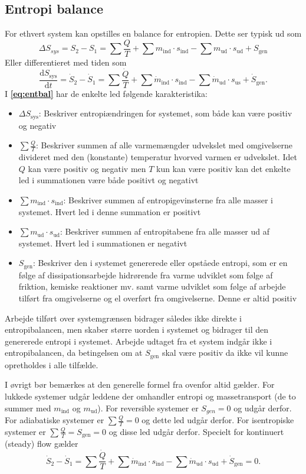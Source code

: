 \subsection{Entropi balance}
For ethvert system kan opstilles en balance for entropien. Dette ser typisk ud som
\begin{equation} \label{eq:entbal}
  \Delta S_{sys} = S_2 - S_1 = \sum \frac{Q}{T} + \sum m_{\mathrm{ind}} \cdot s_{\mathrm{ind}} - \sum m_{\mathrm{ud}} \cdot s_{\mathrm{ud}} + S_{\mathrm{gen}}
\end{equation}
Eller differentieret med tiden som
\[ 
\frac{\mathrm{d}S_{\mathrm{sys}}}{\mathrm{d}t} = \dot{S}_2 - \dot{S}_1 = \sum \frac{\dot{Q}}{T} + \sum \dot{m}_{\mathrm{ind}} \cdot s_{\mathrm{ind}} - \sum \dot{m}_{\mathrm{ud}} \cdot s_{\mathrm{us}} + \dot{S}_{\mathrm{gen}}
.\]
I \textbf{\autoref{eq:entbal}} har de enkelte led følgende karakteristika:
\begin{itemize}
  \item $\Delta S_{\mathrm{sys}}$: Beskriver entropiændringen for systemet, som både kan være positiv og negativ
  \item $\sum \frac{Q}{T}$: Beskriver summen af alle varmemængder udvekslet med omgivelserne divideret med den (konstante) temperatur hvorved varmen er udvekslet. Idet $Q$ kan være positiv og negativ men $T$ kun kan være positiv kan det enkelte led i summationen være både positivt og negativt
  \item $\sum m_{\mathrm{ind}} \cdot s_{\mathrm{ind}}$: Beskriver summen af entropigevinsterne fra alle masser i systemet. Hvert led i denne summation er positivt
  \item $\sum m_{\mathrm{ud}} \cdot s_{\mathrm{ud}}$: Beskriver summen af entropitabene fra alle masser ud af systemet. Hvert led i summationen er negativt
  \item $S_{\mathrm{gen}}$: Beskriver den i systemet genererede eller opståede entropi, som er en følge af dissipationsarbejde hidrørende fra varme udviklet som følge af friktion, kemiske reaktioner mv. samt varme udviklet som følge af arbejde tilført fra omgivelserne og el overført fra omgivelserne. Denne er altid positiv
\end{itemize}
Arbejde tilført over systemgrænsen bidrager således ikke direkte i entropibalancen, men skaber større uorden i systemet og bidrager til den genererede entropi i systemet. Arbejde udtaget fra et system indgår ikke i entropibalancen, da betingelsen om at $S_{\mathrm{gen}}$ skal være positiv da ikke vil kunne opretholdes i alle tilfælde. 

I øvrigt bør bemærkes at den generelle formel fra ovenfor altid gælder. For lukkede systemer udgår leddene der omhandler entropi og massetransport (de to summer med $m_{\mathrm{ind}}$ og $m_{\mathrm{ud}}$). For reversible systemer er $S_{gen} = 0$ og udgår derfor. For adiabatiske systemer er $\sum \frac{Q}{T} = 0$ og dette led udgår derfor. For isentropiske systemer er $\sum \frac{Q}{T} = S_{\mathrm{gen}} = 0$ og disse led udgår derfor. Specielt for kontinuert (steady) flow gælder
\[ 
\dot{S}_2 - \dot{S}_1 = \sum \frac{\dot{Q}}{T} + \sum \dot{m}_{\mathrm{ind}} \cdot s_{\mathrm{ind}} - \sum \dot{m}_{\mathrm{ud}} \cdot s_{\mathrm{ud}} + \dot{S}_{\mathrm{gen}} = 0
.\]

